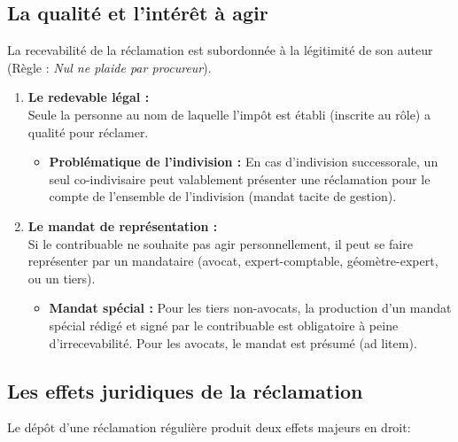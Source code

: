 \documentclass[Cours_contentieuxTF2026.tex]{subfiles}
\begin{document}
\subsection{La qualité et l'intérêt à agir}

La recevabilité de la réclamation est subordonnée à la légitimité de son auteur (Règle : \textit{Nul ne plaide par procureur}).

\begin{enumerate}

\item  \textbf{Le redevable légal :}\\
Seule la personne au nom de laquelle l'impôt est établi (inscrite au rôle) a qualité pour réclamer.

\begin{itemize}[label=\tiny$\blacksquare$]
\item \textbf{ Problématique de l'indivision :} En cas d'indivision successorale, un seul co-indivisaire peut valablement présenter une réclamation pour le compte de l'ensemble de l'indivision (mandat tacite de gestion).
\end{itemize}

\item  \textbf{Le mandat de représentation :} \\
Si le contribuable ne souhaite pas agir personnellement, il peut se faire représenter par un mandataire (avocat, expert-comptable, géomètre-expert, ou un tiers).

\begin{itemize}[label=\tiny$\blacksquare$]
\item  \textbf{Mandat spécial :} Pour les tiers non-avocats, la production d'un mandat spécial rédigé et signé par le contribuable est obligatoire à peine d'irrecevabilité. Pour les avocats, le mandat est présumé (ad litem).
\end{itemize}

\end{enumerate}

\subsection{Les effets juridiques de la réclamation}
Le dépôt d'une réclamation régulière produit deux effets majeurs en droit:
\end{document}
